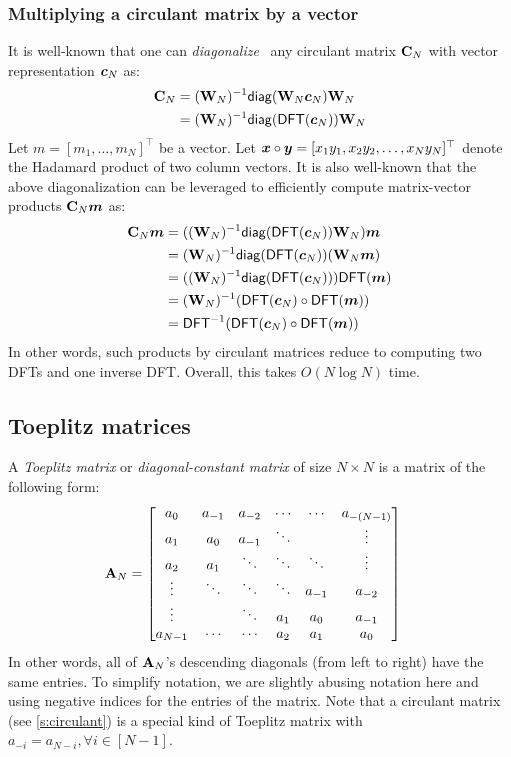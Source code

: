 \subsubsection{Multiplying a circulant matrix by a vector}
\label{s:circulant:diag-dft}
\label{s:circulant:multiply-vec}
It is well-known that one can \textit{diagonalize}~\cite{Diag20} any circulant matrix $\mathbf{C}_N$ with vector representation $\bm{c}_N$ as:
\begin{align}
    \mathbf{C}_N &= (\mathbf{W}_N)^{-1} \mathsf{diag}(\mathbf{W}_N \bm{c}_N) \mathbf{W}_N\\
               &= (\mathbf{W}_N)^{-1} \mathsf{diag}(\mathsf{DFT}(\bm{c}_N)) \mathbf{W}_N
\end{align}
Let $m=[m_1,\dots,m_N]^\top$ be a vector.
Let $\bm{x}\circ\bm{y} = [x_1 y_1, x_2 y_2,\dots, x_N y_N]^\top$ denote the Hadamard product of two column vectors.
It is also well-known that the above diagonalization can be leveraged to efficiently compute matrix-vector products $\mathbf{C}_N\bm{m}$ as:
\begin{align}
    \mathbf{C}_N \bm{m}
        &= ((\mathbf{W}_N)^{-1} \mathsf{diag}(\mathsf{DFT}(\bm{c}_N)) \mathbf{W}_N)\bm{m}\\
        &= (\mathbf{W}_N)^{-1} \mathsf{diag}(\mathsf{DFT}(\bm{c}_N)) (\mathbf{W}_N\bm{m})\\
        &= ((\mathbf{W}_N)^{-1} \mathsf{diag}(\mathsf{DFT}(\bm{c}_N))) \mathsf{DFT}(\bm{m})\\
        &= (\mathbf{W}_N)^{-1} (\mathsf{DFT}(\bm{c}_N)\circ \mathsf{DFT}(\bm{m}))\\
        &= \mathsf{DFT}^{-1}(\mathsf{DFT}(\bm{c}_N)\circ \mathsf{DFT}(\bm{m}))
\end{align}
In other words, such products by circulant matrices reduce to computing two DFTs and one inverse DFT.
Overall, this takes $O(N\log{N})$ time.

\subsection{Toeplitz matrices}
\label{s:toeplitz}

A \textit{Toeplitz matrix} or \textit{diagonal-constant matrix} of size $N\times N$ is a matrix of the following form:
\begin{align}
\mathbf{A}_N&=\begin{bmatrix}
    a_{0}   & a_{-1} & a_{-2} & \cdots & \cdots & a_{-(N-1)}\\
    a_{1}   & a_{0}  & a_{-1} & \ddots &        & \vdots\\
    a_{2}   & a_{1}  & \ddots & \ddots & \ddots & \vdots\\
    \vdots  & \ddots & \ddots & \ddots & a_{-1} & a_{-2}\\
    \vdots  &        & \ddots & a_{1}  & a_{0}  & a_{-1}\\
    a_{N-1} & \cdots & \cdots & a_{2}  & a_{1}  & a_{0}
\end{bmatrix}
\end{align}
In other words, all of $\mathbf{A}_N$'s descending diagonals (from left to right) have the same entries.
To simplify notation, we are slightly abusing notation here and using negative indices for the entries of the matrix.
Note that a circulant matrix (see \cref{s:circulant}) is a special kind of Toeplitz matrix with $a_{-i} = a_{N-i},\forall i\in [N - 1]$.

